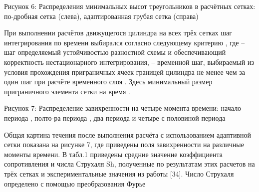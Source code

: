 Рисунок 6: 	Распределения минимальных высот треугольников в расчётных сетках: по-дробная сетка (слева), адаптированная грубая сетка (справа)

При выполнении расчётов движущегося цилиндра на всех трёх сетках шаг интегрирования по времени выбирался согласно следующему критерию
, 
где   – шаг определяемый устойчивостью разностной схемы и обеспечивающий корректность нестационарного интегрирования,   – временной шаг, выбираемый из условия прохождения приграничных ячеек границей цилиндра не менее чем за один шаг при расчёте временного слоя   
.
Здесь   минимальный размер приграничного элемента сетки на время  .



Рисунок 7: 	Распределение завихренности на четыре момента времени: начало периода  , полто-ра периода  , два периода  и четыре с половиной периода  


Общая картина течения после выполнения расчёта с использованием адаптивной сетки показана на рисунке 7, где приведены поля завихренности на различные моменты времени. В табл.1 приведены средние значение коэффициента сопротивления  и числа Струхаля Sh, полученные по результатам этих расчетов на трёх сетках и экспериментальные значения из работы [34]. Число Струхаля   определено с помощью преобразования Фурье


%	
\clearpage